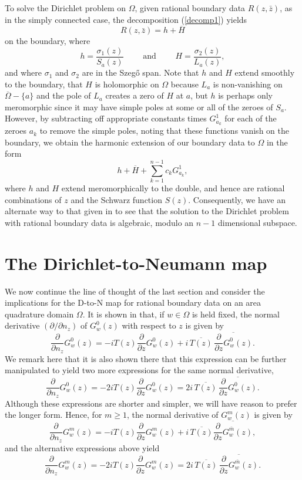 \documentclass[12pt]{amsart}
\newcommand\dee{\partial}
\newcommand\Om{\Omega}
\newcommand\Obar{\overline{\Omega}}
\numberwithin{equation}{section}
\begin{document}
To solve the Dirichlet problem on $\Om$, given
rational boundary data $R(z,\bar z)$,
as in the simply connected case, the decomposition
(\ref{decomp1}) yields
$$R(z,\bar z)=h+\overline{H}$$
on the boundary, where
$$h=\frac{\sigma_1(z)}{S_a(z)}\qquad\text{ and }\qquad
H=\frac{\sigma_2(z)}{L_a(z)},$$
and where $\sigma_1$ and $\sigma_2$ are in the Szeg\H o
span. Note that $h$ and $H$ extend smoothly to the
boundary, that $H$ is holomorphic on $\Om$ because
$L_a$ is non-vanishing on $\Obar-\{a\}$ and the pole
of $L_a$ creates a zero of $H$ at $a$, but $h$ is
perhaps only meromorphic since it may have simple poles
at some or all of the zeroes of $S_a$. However, by
subtracting off appropriate constants times $G_{a_k}^1$
for each of the zeroes $a_k$ to remove the simple poles,
noting that these functions vanish on the boundary,
we obtain the harmonic extension of our boundary data
to $\Om$ in the form
\begin{equation}
\label{decomp3}
h+\overline{H}+\sum_{k=1}^{n-1}c_kG_{a_k}^1,
\end{equation}
where $h$ and $H$ extend meromorphically to the double,
and hence are rational combinations of $z$ and the
Schwarz function $S(z)$. Consequently, we have an
alternate way to that given in \cite{B8} to see
that the solution to the Dirichlet problem with rational
boundary data is algebraic, modulo an $n-1$ dimensional
subspace.

\section{The Dirichlet-to-Neumann map}
\label{sec4}

We now continue the line of thought of the last section
and consider the implications for the D-to-N map for
rational boundary data on an area quadrature domain
$\Om$. It is shown in \cite[p.~134-135]{B1} that, if $w\in\Om$
is held fixed, the normal derivative $(\dee/\dee n_z)$ of
$G_w^0(z)$ with respect to $z$ is given by
$$\frac{\dee}{\dee n_z}G_w^0(z)=
-iT(z)\frac{\dee}{\dee z}G_w^0(z)
+i\,\overline{T(z)}\,\overline{\frac{\dee}{\dee z}G_w^0(z)}.$$
We remark here that it is also shown there that this
expression can be further manipulated to yield two more
expressions for the same normal derivative,
$$\frac{\dee}{\dee n_z}G_w^0(z)=
-2iT(z)\frac{\dee}{\dee z}G_w^0(z)=
2i\,\overline{T(z)}\,\overline{\frac{\dee}{\dee z}G_w^0(z)}.$$
Although these expressions are shorter and simpler, we will
have reason to prefer the longer form.
Hence, for $m\ge 1$, the normal derivative of $G_w^m(z)$ is
given by
\begin{equation}
\label{normalG}
\frac{\dee}{\dee n_z}G_w^m(z)=
-iT(z)\frac{\dee}{\dee z}G_w^m(z)
+i\,\overline{T(z)}\overline{\frac{\dee}{\dee z}G_w^{\bar m}(z)},
\end{equation}
and the alternative expressions above yield
$$\frac{\dee}{\dee n_z}G_w^m(z)=
-2iT(z)\frac{\dee}{\dee z}G_w^m(z)=
2i\,\overline{T(z)}\,\overline{\frac{\dee}{\dee z}G_w^{\bar m}(z)}.$$
\end{document}
